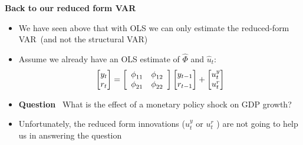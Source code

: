 \begin{frame}
{\textbf{Back to our reduced form VAR}} \bigskip

\begin{itemize}
\item We have seen above that with OLS we can only estimate the reduced-form
VAR\ (and not the structural VAR) \bigskip

\item Assume we already have an OLS estimate of $\hat{\Phi}$ and $\hat{u}%
_{t} $:%
\begin{equation*}
\begin{bmatrix}
y_{t} \\ 
r_{t}%
\end{bmatrix}%
=\left[ 
\begin{array}{cc}
\phi _{11} & \phi _{12} \\ 
\phi _{21} & \phi _{22}%
\end{array}%
\right] 
\begin{bmatrix}
y_{t-1} \\ 
r_{t-1}%
\end{bmatrix}%
+%
\begin{bmatrix}
u_{t}^{y} \\ 
u_{t}^{r}%
\end{bmatrix}%
\medskip
\end{equation*}%
\pause

\item \textbf{Question} \ What is the effect of a monetary policy shock on
GDP growth?\bigskip\pause

\item Unfortunately, the reduced form innovations ($u_{t}^{y}$ or $u_{t}^{r}$%
) are not going to help us in answering the question
\end{itemize}
\end{frame}


